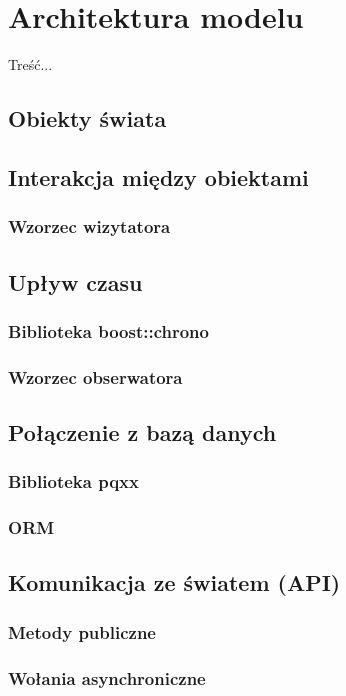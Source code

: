 {\section[Architektura modelu][Architektura modelu]{Architektura modelu}
\par{ Treść... }
\subsection{Obiekty świata}
\subsection{Interakcja między obiektami}
\subsubsection{Wzorzec wizytatora}
\subsection{Upływ czasu}
\subsubsection{Biblioteka boost::chrono}
\subsubsection{Wzorzec obserwatora}
\subsection{Połączenie z bazą danych}
\subsubsection{Biblioteka pqxx}
\subsubsection{ORM}
\subsection{Komunikacja ze światem (API)}
\subsubsection{Metody publiczne}
\subsubsection{Wołania asynchroniczne}
}
